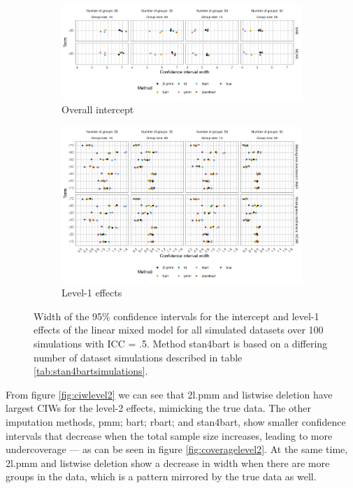 \documentclass[3p,12pt,a4paper]{elsarticle}
\begin{document}
\begin{figure}[H]
    \centering
    \begin{subfigure}[b]{1\textwidth}
        \centering
        \includegraphics[width=1\textwidth]{ciwintercept.png}
        \caption{Overall intercept}
        \label{fig:ciwintercept}
    \end{subfigure}
    \begin{subfigure}[b]{1\textwidth}
        \centering
        \includegraphics[width=1\textwidth]{ciwlevel1.png}
        \caption{Level-1 effects}
        \label{fig:ciwlevel1}
    \end{subfigure}
    \caption{Width of the 95\% confidence intervals for the intercept and level-1 effects of the linear mixed model for all simulated datasets over 100 simulations with ICC = .5. Method stan4bart is based on a differing number of dataset simulations described in table \ref{tab:stan4bartsimulations}.}
    \label{fig:ciwinterceptlevel1}
\end{figure}

From figure \ref{fig:ciwlevel2} we can see that 2l.pmm and listwise deletion have largest CIWs for the level-2 effects, mimicking the true data. The other imputation methods, pmm; bart; rbart; and stan4bart, show smaller confidence intervals that decrease when the total sample size increases, leading to more undercoverage --- as can be seen in figure \ref{fig:coveragelevel2}. At the same time, 2l.pmm and listwise deletion show a decrease in width when there are more groups in the data, which is a pattern mirrored by the true data as well. 
\end{document}
